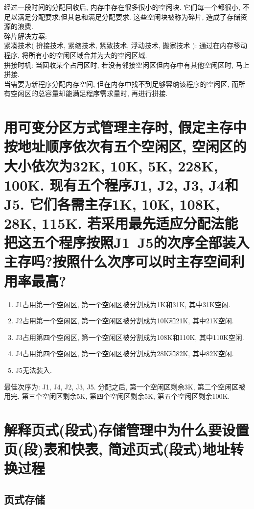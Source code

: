 \documentclass[a4paper, 12pt, notitlepage]{article}
\begin{document}
	经过一段时间的分配回收后, 内存中存在很多很小的空闲块. 它们每一个都很小, 不足以满足分配要求;但其总和满足分配要求. 这些空闲块被称为碎片, 造成了存储资源的浪费. \\
	
	碎片解决方案: \\
	
	紧凑技术( 拚接技术, 紧缩技术, 紧致技术, 浮动技术, 搬家技术 ): 通过在内存移动程序, 将所有小的空闲区域合并为大的空闲区域. \\
	
	拚接时机: 当回收某个占用区时, 若没有邻接空闲区但内存中有其他空闲区时, 马上拼接. \\
	
	当需要为新程序分配内存空间, 但在内存中找不到足够容纳该程序的空闲区, 而所有空闲区的总容量却能满足程序需求量时, 再进行拼接. \\

\section{用可变分区方式管理主存时, 假定主存中按地址顺序依次有五个空闲区, 空闲区的大小依次为32K, 10K, 5K, 228K, 100K. 现有五个程序J1, J2, J3, J4和J5. 它们各需主存1K, 10K, 108K, 28K, 115K. 若采用最先适应分配法能把这五个程序按照J1~J5的次序全部装入主存吗?按照什么次序可以时主存空间利用率最高?}

\begin{enumerate}
	\item J1占用第一个空闲区, 第一个空闲区被分割成为1K和31K, 其中31K空闲. 
	\item J2占用第一个空闲区, 第一个空闲区被分割成为10K和21K, 其中21K空闲. 
	\item J3占用第四个空闲区, 第一个空闲区被分割成为108K和110K, 其中110K空闲. 
	\item J4占用第四个空闲区, 第一个空闲区被分割成为28K和82K, 其中82K空闲. 
	\item J5无法装入. 
\end{enumerate}

	最佳次序为: J1, J4, J2, J3, J5. 分配之后, 第一个空闲区剩余3K, 第二个空闲区被用完, 第三个空闲区剩余5K, 第四个空闲区剩余5K, 第五个空闲区剩余100K. 

\section{解释页式(段式)存储管理中为什么要设置页(段)表和快表, 简述页式(段式)地址转换过程}

\subsection{页式存储}
\end{document}
